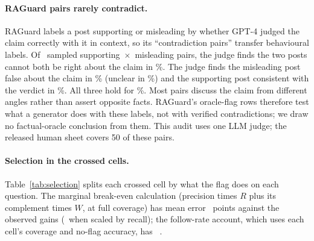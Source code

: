 \paragraph{RAGuard pairs rarely contradict.} RAGuard labels a post supporting or misleading by whether GPT-4 judged the claim correctly
with it in context, so its ``contradiction pairs'' transfer behavioural labels. Of \rgAudN\ sampled
supporting~$\times$~misleading pairs, the judge finds the two posts cannot both be right about the claim in
\rgAudContradict\%. The judge finds the misleading post false about the claim in \rgAudBFalse\% (unclear in
\rgAudBUnclear\%) and the supporting post consistent with the verdict in \rgAudASupports\%. All three hold for
\rgAudVerified\%. Most pairs discuss the claim from different angles rather than assert opposite
facts. RAGuard's oracle-flag rows therefore test what a generator does with these labels, not with verified
contradictions; we draw no factual-oracle conclusion from them. This audit uses one LLM judge; the released
human sheet covers 50 of these pairs.


\paragraph{Selection in the crossed cells.} Table~\ref{tab:selection} splits each crossed cell by what the flag does
on each question. The marginal break-even calculation (precision times $R$ plus its complement times $W$, at full
coverage) has mean error \selMargMae\ points against the observed gains (\selMargCovMae\ when scaled by recall); the
follow-rate account, which uses each cell's coverage and no-flag accuracy, has \predEightMae\ \predEightMaeCI.
